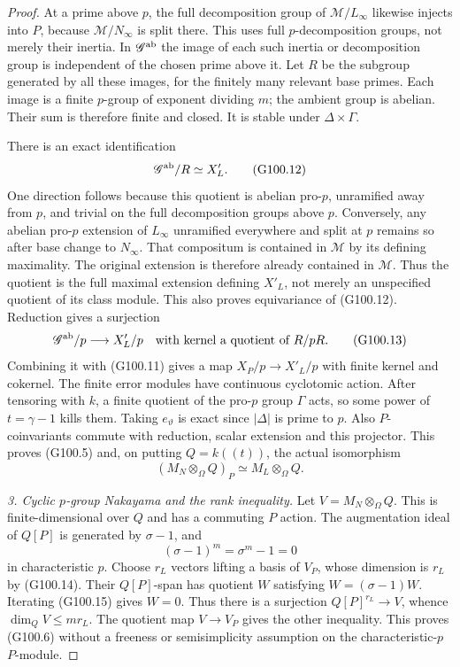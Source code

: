 \begin{proof}
At a prime above $p$, the full decomposition group of
$\mathcal M/L_\infty$ likewise injects into $P$, because
$\mathcal M/N_\infty$ is split there.  This uses full
$p$-decomposition groups, not merely their inertia.
In $\mathscr G^{\rm ab}$ the image of each such inertia or
decomposition group is independent of the chosen prime above it.
Let $R$ be the subgroup generated by all these images, for the
finitely many relevant base primes.  Each image is a finite
$p$-group of exponent dividing $m$; the ambient group is abelian.
Their sum is therefore finite and closed.
It is stable under $\Delta\times\Gamma$.

There is an exact identification
\[
                 \mathscr G^{\rm ab}/R\simeq X'_L.
 \tag{G100.12}
\]
One direction follows because this quotient is abelian pro-$p$,
unramified away from $p$, and trivial on the full decomposition
groups above $p$.  Conversely, any abelian pro-$p$ extension
of $L_\infty$ unramified everywhere and split at $p$ remains
so after base change to $N_\infty$.  That compositum is contained
in $\mathcal M$ by its defining maximality.  The original extension
is therefore already contained in $\mathcal M$.
Thus the quotient is the full maximal extension defining $X'_L$,
not merely an unspecified quotient of its class module.
This also proves equivariance of (G100.12).
Reduction gives a surjection
\[
       \mathscr G^{\rm ab}/p\longrightarrow X'_L/p
                  \quad\hbox{with kernel a quotient of }R/pR.
 \tag{G100.13}
\]
Combining it with (G100.11) gives a map
$X_P/p\to X'_L/p$ with finite kernel and cokernel.
The finite error modules have continuous cyclotomic action.
After tensoring with $k$, a finite quotient of the pro-$p$ group
$\Gamma$ acts, so some power of $t=\gamma-1$ kills them.
Taking $e_\vartheta$ is exact since $|\Delta|$ is prime to $p$.
Also $P$-coinvariants commute with reduction, scalar extension
and this projector.  This proves (G100.5) and, on putting
$Q=k((t))$, the actual isomorphism
\[
                   (M_N\otimes_\Omega Q)_P
                               \simeq M_L\otimes_\Omega Q.
 \tag{G100.14}
\]

\emph{3. Cyclic $p$-group Nakayama and the rank inequality.}
Let $V=M_N\otimes_\Omega Q$.  This is finite-dimensional over
$Q$ and has a commuting $P$ action.  The augmentation ideal of
$Q[P]$ is generated by $\sigma-1$, and
\[
                         (\sigma-1)^m=\sigma^m-1=0
 \tag{G100.15}
\]
in characteristic $p$.
Choose $r_L$ vectors lifting a basis of $V_P$, whose dimension
is $r_L$ by (G100.14).  Their $Q[P]$-span has quotient $W$
satisfying $W=(\sigma-1)W$.  Iterating (G100.15) gives $W=0$.
Thus there is a surjection $Q[P]^{r_L}\to V$, whence
$\dim_QV\le m r_L$.
The quotient map $V\to V_P$ gives the other inequality.
This proves (G100.6) without a freeness or semisimplicity
assumption on the characteristic-$p$ $P$-module.


\end{proof}
